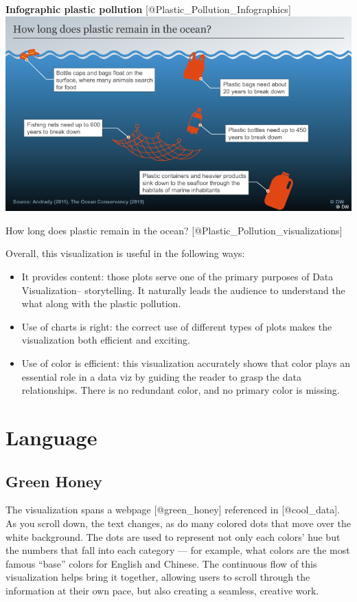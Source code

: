 \documentclass[]{book}
\providecommand{\tightlist}{%
  \setlength{\itemsep}{0pt}\setlength{\parskip}{0pt}}
\theoremstyle{definition}
\theoremstyle{definition}
\theoremstyle{definition}
\theoremstyle{remark}
\begin{document}
\textbf{Infographic plastic pollution}
{[}@Plastic\_Pollution\_Infographics{]}
\includegraphics{images/ocean_plastic.png}

How long does plastic remain in the ocean?
{[}@Plastic\_Pollution\_visualizations{]}

Overall, this visualization is useful in the following ways:

\begin{itemize}
\tightlist
\item
  It provides content: those plots serve one of the primary purposes of
  Data Visualization-- storytelling. It naturally leads the audience to
  understand the what along with the plastic pollution.
\item
  Use of charts is right: the correct use of different types of plots
  makes the visualization both efficient and exciting.
\item
  Use of color is efficient: this visualization accurately shows that
  color plays an essential role in a data viz by guiding the reader to
  grasp the data relationships. There is no redundant color, and no
  primary color is missing.
\end{itemize}

\section{Language}\label{language}

\subsection{Green Honey}\label{green-honey}

The visualization spans a webpage {[}@green\_honey{]} referenced in
{[}@cool\_data{]}. As you scroll down, the text changes, as do many
colored dots that move over the white background. The dots are used to
represent not only each colors' hue but the numbers that fall into each
category --- for example, what colors are the most famous ``base''
colors for English and Chinese. The continuous flow of this
visualization helps bring it together, allowing users to scroll through
the information at their own pace, but also creating a seamless,
creative work.
\end{document}
